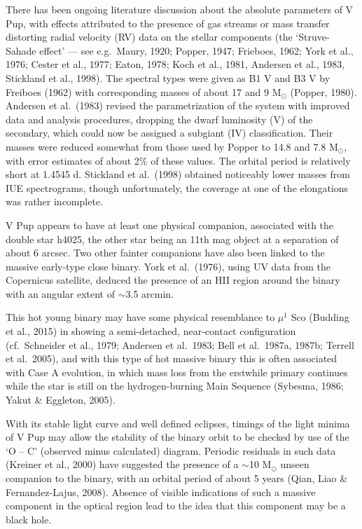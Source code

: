 \documentclass[useAMS,usenatbib]{mnras}                                                                           \usepackage[pdftex]{graphicx}
\begin{document}
  There has been ongoing literature discussion about the absolute parameters of V Pup,
  with effects attributed to the presence of gas streams or mass transfer
  distorting radial velocity (RV) data on the stellar components
  (the `Struve-Sahade effect' ---
  see e.g.\  Maury, 1920; Popper, 1947; Frieboes, 1962;  York et al., 1976; 
  Cester et al., 1977; Eaton, 1978; Koch et al., 1981,   Andersen et al., 1983,
   Stickland et al., 1998). 
  The spectral types were given as B1 V and B3 V by Freiboes (1962)
  with corresponding masses  of about 17 and 9  M$_{\odot}$ (Popper, 1980). 
  Andersen et al.\ (1983) revised the parametrization of the system
  with improved data and analysis procedures, dropping the dwarf luminosity
  (V) of the secondary, which could now be assigned a subgiant (IV) classification.
  Their masses were reduced somewhat from those used by Popper to 14.8
   and 7.8   M$_{\odot}$,
  with error estimates of about 2\% of these values.
  The orbital period is relatively short at 1.4545 d.
  Stickland et al.\ (1998) obtained noticeably lower masses from IUE spectrograms,
  though unfortunately, the coverage at one of the elongations was rather incomplete.
  
V Pup appears to have at least one physical companion, associated with the double star
h4025, the other star being an 11th mag object at a separation of about 6 arcsec. 
Two other fainter companions have also been linked to the massive early-type close binary.
York et al.\ (1976), using UV data from the Copernicus satellite, deduced the presence
of an HII region around the binary with an angular extent of $\sim$3.5 arcmin.

This hot young
 binary may have some physical resemblance to $\mu^1$ Sco (Budding et al., 2015)
in showing a semi-detached, near-contact configuration
(cf.\ Schneider et al., 1979; Andersen et al.\ 1983; Bell et al.\ 1987a, 1987b;
Terrell et al.\ 2005), and with this type of hot massive binary this
is often associated with Case A evolution, in which mass loss
from the erstwhile primary continues while the star is still 
on the hydrogen-burning Main Sequence (Sybesma, 1986;
Yakut \& Eggleton, 2005).
   
With its stable light curve and well defined eclipses, 
 timings of the light minima of V Pup 
 may allow the stability of the binary orbit to be checked
 by use of the `O -- C' (observed minus calculated) diagram. 
 Periodic residuals in such data  (Kreiner et al., 2000) have suggested the presence of a 
$\sim$10 M$_{\odot}$ unseen companion to the binary, with
an orbital period of about 5 years (Qian, Liao \& 
Fernandez-Lajus, 2008). Absence of visible indications of such a massive component
in the optical region lead to the idea that this component may
be a black hole.
\end{document}
